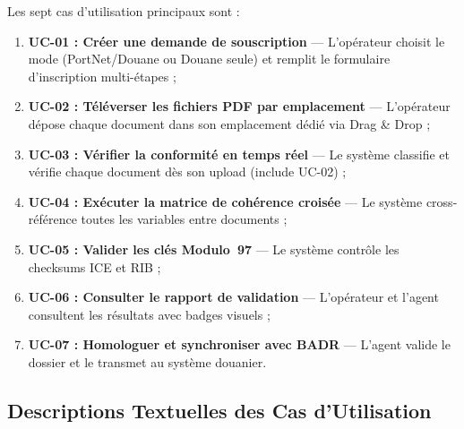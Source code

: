 Les sept cas d'utilisation principaux sont :

\begin{enumerate}[leftmargin=*, itemsep=4pt]
    \item \textbf{UC-01 : Cr\'{e}er une demande de souscription} --- L'op\'{e}rateur choisit le mode (PortNet/Douane ou Douane seule) et remplit le formulaire d'inscription multi-\'{e}tapes ;
    \item \textbf{UC-02 : T\'{e}l\'{e}verser les fichiers PDF par emplacement} --- L'op\'{e}rateur d\'{e}pose chaque document dans son emplacement d\'{e}di\'{e} via Drag \& Drop ;
    \item \textbf{UC-03 : V\'{e}rifier la conformit\'{e} en temps r\'{e}el} --- Le syst\`{e}me classifie et v\'{e}rifie chaque document d\`{e}s son upload (\guillemotleft include \guillemotright{} UC-02) ;
    \item \textbf{UC-04 : Ex\'{e}cuter la matrice de coh\'{e}rence crois\'{e}e} --- Le syst\`{e}me cross-r\'{e}f\'{e}rence toutes les variables entre documents ;
    \item \textbf{UC-05 : Valider les cl\'{e}s Modulo~97} --- Le syst\`{e}me contr\^{o}le les checksums ICE et RIB ;
    \item \textbf{UC-06 : Consulter le rapport de validation} --- L'op\'{e}rateur et l'agent consultent les r\'{e}sultats avec badges visuels ;
    \item \textbf{UC-07 : Homologuer et synchroniser avec BADR} --- L'agent valide le dossier et le transmet au syst\`{e}me douanier.
\end{enumerate}

\subsection{Descriptions Textuelles des Cas d'Utilisation}

